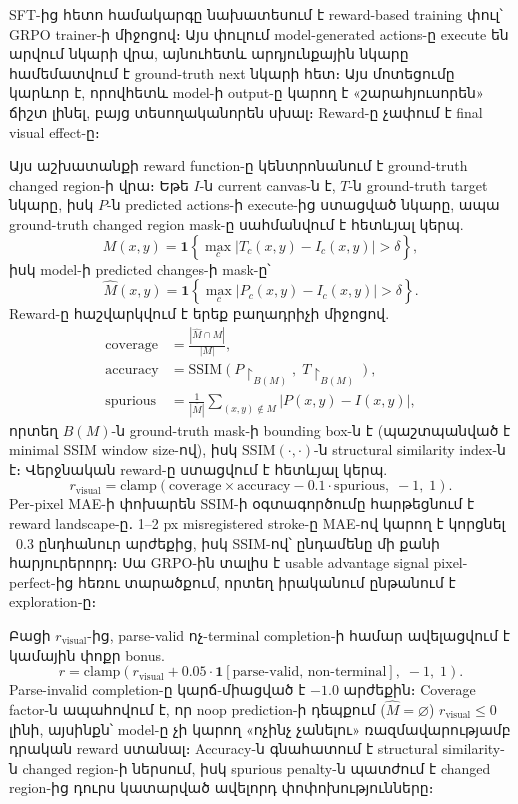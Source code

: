 \documentclass[12pt,a4paper]{report}
\newcommand{\Eng}[1]{\textenglish{#1}}
\begin{document}
SFT-ից հետո համակարգը նախատեսում է reward-based training փուլ՝ \Eng{GRPO} trainer-ի միջոցով։ Այս փուլում model-generated actions-ը execute են արվում նկարի վրա, այնուհետև արդյունքային նկարը համեմատվում է ground-truth next նկարի հետ։ Այս մոտեցումը կարևոր է, որովհետև model-ի output-ը կարող է «շարահյուսորեն» ճիշտ լինել, բայց տեսողականորեն սխալ։ Reward-ը չափում է final visual effect-ը։

Այս աշխատանքի reward function-ը կենտրոնանում է ground-truth changed region-ի վրա։ Եթե $I$-ն current canvas-ն է, $T$-ն ground-truth target նկարը, իսկ $P$-ն predicted actions-ի execute-ից ստացված նկարը, ապա ground-truth changed region mask-ը սահմանվում է հետևյալ կերպ.
\begin{equation}
    M(x,y)=\mathbf{1}\left\{\max_c |T_c(x,y)-I_c(x,y)|>\delta\right\},
\end{equation}
իսկ model-ի predicted changes-ի mask-ը՝
\begin{equation}
    \hat{M}(x,y)=\mathbf{1}\left\{\max_c |P_c(x,y)-I_c(x,y)|>\delta\right\}.
\end{equation}
Reward-ը հաշվարկվում է երեք բաղադրիչի միջոցով.
\begin{align}
    \mathrm{coverage} &= \frac{|\hat{M} \cap M|}{|M|}, \\
    \mathrm{accuracy} &= \mathrm{SSIM}\!\left(P\!\restriction_{B(M)},\;T\!\restriction_{B(M)}\right), \\
    \mathrm{spurious} &= \frac{1}{|\overline{M}|}\sum_{(x,y)\notin M}\left|P(x,y)-I(x,y)\right|,
\end{align}
որտեղ $B(M)$-ն ground-truth mask-ի bounding box-ն է (պաշտպանված է minimal SSIM window size-ով), իսկ $\mathrm{SSIM}(\cdot,\cdot)$-ն structural similarity index-ն է։ Վերջնական reward-ը ստացվում է հետևյալ կերպ.
\begin{equation}
    r_{\mathrm{visual}} = \mathrm{clamp}\!\left(\mathrm{coverage}\times\mathrm{accuracy} - 0.1\cdot\mathrm{spurious},\;-1,\;1\right).
\end{equation}
Per-pixel MAE-ի փոխարեն SSIM-ի օգտագործումը հարթեցնում է reward landscape-ը․ 1–2 px misregistered stroke-ը MAE-ով կարող է կորցնել ~0.3 ընդհանուր արժեքից, իսկ SSIM-ով՝ ընդամենը մի քանի հարյուրերորդ։ Սա GRPO-ին տալիս է usable advantage signal pixel-perfect-ից հեռու տարածքում, որտեղ իրականում ընթանում է exploration-ը։

Բացի $r_{\mathrm{visual}}$-ից, parse-valid ոչ-terminal completion-ի համար ավելացվում է կամային փոքր bonus.
\begin{equation}
    r = \mathrm{clamp}(r_{\mathrm{visual}} + 0.05\cdot \mathbf{1}[\text{parse-valid, non-terminal}],\;-1,\;1).
\end{equation}
Parse-invalid completion-ը կարճ-միացված է $-1.0$ արժեքին։ Coverage factor-ն ապահովում է, որ noop prediction-ի դեպքում ($\hat{M}=\varnothing$) $r_{\mathrm{visual}}\leq 0$ լինի, այսինքն՝ model-ը չի կարող «ոչինչ չանելու» ռազմավարությամբ դրական reward ստանալ։ Accuracy-ն գնահատում է structural similarity-ն changed region-ի ներսում, իսկ spurious penalty-ն պատժում է changed region-ից դուրս կատարված ավելորդ փոփոխությունները։
\end{document}
